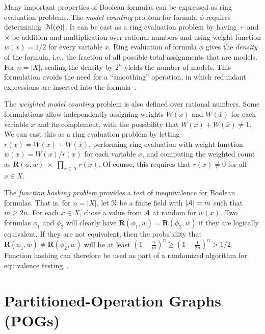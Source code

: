 \documentclass[letterpaper,USenglish,cleveref, autoref, thm-restate]{lipics-v2021}
\newcommand{\obar}[1]{\overline{#1}}
\newcommand{\varset}{X}
\newcommand{\ring}{{\cal R}}
\newcommand{\dset}{{\cal A}}
\newcommand{\rep}{\textbf{R}}
\newcommand{\radd}{+}
\newcommand{\rmul}{\times}
\newcommand{\modelset}{{\cal M}}
\begin{document}
Many important properties of Boolean formulas can be
expressed as ring evaluation problems.  The
{\em model counting} problem for formula $\phi$ requires determining $|\modelset(\phi)|$.
It can be cast as a ring evaluation problem by having $\radd$ and
$\rmul$ be addition and multiplication over rational numbers and using
weight function $w(x) = 1/2$ for every variable $x$.
Ring evaluation of formula $\phi$ gives the {\em density} of
the formula, i.e., the fraction of all possible total assignments that are
models.  For $n = |\varset|$, scaling the density by $2^n$
yields the number of models.  This formulation avoids the need for a ``smoothing'' operation,
in which redundant expressions are inserted into the formula~\cite{darwiche:jair:2002}.

The {\em weighted model counting}  problem is also defined over
rational numbers.  Some formulations  allow
independently assigning weights $W(x)$ and $W(\obar{x})$ for each variable $x$ and its complement, with the possibility that
$W(x) + W(\obar{x}) \not = 1$.
We can cast this as a
ring evaluation problem by letting $r(x) = W(x) + W(\obar{x})$,
performing ring evaluation with weight function $w(x) = W(x)/r(x)$ for each
variable $x$, and computing the weighted count
as $\rep(\phi, w)\; \rmul\; \prod_{x \in \varset} r(x)$.
Of course, this requires that $r(x) \not = 0$ for all $x \in \varset$.

The {\em function hashing problem} provides a test
of inequivalence for Boolean formulas.  That is, for $n = |\varset|$, let $\ring$ be a
finite  field with $|\dset| = m$ such that $m \geq 2 n$.  For each $x \in \varset$, chose a value from $\dset$ at random for $w(x)$.  Two formulas
$\phi_1$ and $\phi_2$ will clearly have $\rep(\phi_1, w) = \rep(\phi_2, w)$
if they are logically equivalent.
If they are not equivalent, then
the probability that $\rep(\phi_1, w) \not = \rep(\phi_2, w)$ will be at
least $\left(1-\frac{1}{m}\right)^n \geq \left(1-\frac{1}{2n}\right)^n > 1/2$.
Function hashing can therefore be used as part of a
randomized algorithm for equivalence testing~\cite{blum:ipl:1980}.


\section{Partitioned-Operation Graphs (POGs)}
\label{sect:pog}
\end{document}
